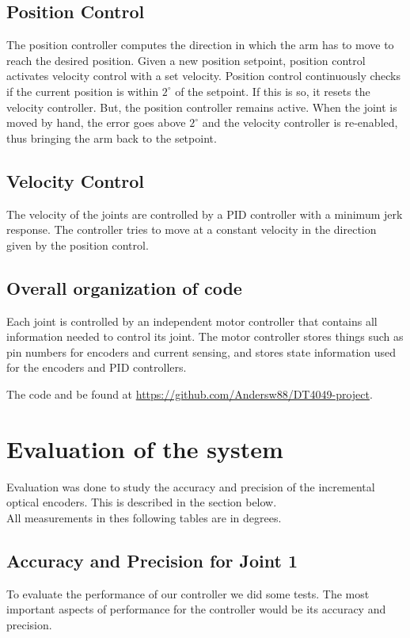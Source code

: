 \documentclass[10pt,a4paper]{article}
\begin{document}
\subsection{Position Control}
The position controller computes the direction in which the arm has to
move to reach the desired position. Given a new position setpoint,
position control activates velocity control with a set
velocity. Position control continuously checks if the current position
is within \( 2^{\circ}\) of the setpoint. If this is so, it resets the
velocity controller. But, the position controller remains active. When
the joint is moved by hand, the error goes above $ 2^{\circ} $ and the
velocity controller is re-enabled, thus bringing the arm back to the
setpoint. 

\subsection{Velocity Control}
The velocity of the joints are controlled by a PID controller with a
minimum jerk response. The controller tries to move at a constant
velocity in the direction given by the position control.

\subsection{Overall organization of code}
Each joint is controlled by an independent motor controller that
contains all information needed to control its joint. The motor
controller stores things such as pin numbers for encoders and current
sensing, and stores state information used for the encoders and PID
controllers.

The code and be found at \url{https://github.com/Andersw88/DT4049-project}.

\section{Evaluation of the system}
Evaluation was done to study the accuracy and precision of the incremental optical encoders. This is described in the section below. \\
All measurements in thes following tables are in degrees. 

\subsection{Accuracy and Precision for Joint 1}
To evaluate the performance of our controller we did some tests. The most important aspects of performance for the controller would be its accuracy and precision. \\
\end{document}
